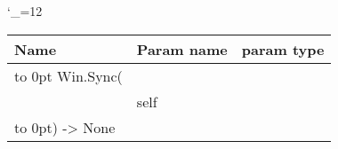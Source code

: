 \begingroup \catcode`\_=12 \tt
\begin{tabular}{lll}
\toprule
\textrm{Name}&\textrm{Param name}&\textrm{param type}\\
\midrule
\hbox to 0pt {Win.Sync(\hss}\\
& self\\
\hbox to 0pt{) -> None\hss}\\
\bottomrule
\end{tabular}
\endgroup
